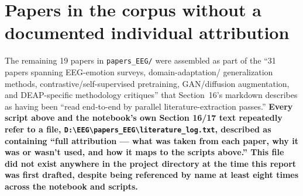 \documentclass[11pt]{report}
\begin{document}
\section{Papers in the corpus without a documented individual attribution}
\label{sec:literature-gap}
The remaining 19 papers in \texttt{papers\_EEG/} were assembled as part of
the ``31 papers spanning EEG-emotion surveys, domain-adaptation/
generalization methods, contrastive/self-supervised pretraining,
GAN/diffusion augmentation, and DEAP-specific methodology critiques'' that
Section~16's markdown describes as having been ``read end-to-end by
parallel literature-extraction passes.'' \textbf{Every script above and the
notebook's own Section 16/17 text repeatedly refer to a file,
\texttt{D:\textbackslash EEG\textbackslash papers\_EEG\textbackslash literature\_log.txt}, described
as containing ``full attribution --- what was taken from each paper, why it
was or wasn't used, and how it maps to the scripts above.'' This file did
not exist anywhere in the project directory at the time this report was
first drafted, despite being referenced by name at least eight times across
the notebook and scripts.}
\end{document}
